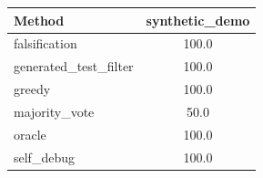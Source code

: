 \begin{tabular}{lc}
\toprule
Method & synthetic_demo \\
\midrule
falsification & 100.0 \\
generated_test_filter & 100.0 \\
greedy & 100.0 \\
majority_vote & 50.0 \\
oracle & 100.0 \\
self_debug & 100.0 \\
\bottomrule
\end{tabular}
